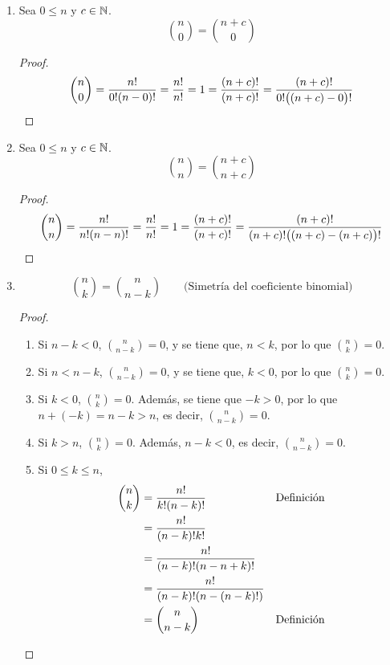 \begin{enumerate}[label=\alph*)]
  \item Sea $0\leq n$ y $c\in \mathbb{N}$. \[\binom{n}{0} = \binom{n+c}{0}\]
  \begin{proof}\leavevmode
    \[\binom{n}{0} = \frac{n!}{0!(n-0)!} = \frac{n!}{n!} = 1 = \frac{(n+c)!}{(n+c)!} = \frac{(n+c)!}{0!\big((n+c)-0\big)!} \qedhere\]
  \end{proof}
  
  \item Sea $0\leq n$ y $c\in \mathbb{N}$. \[\binom{n}{n} = \binom{n+c}{n+c}\]
  \begin{proof}\leavevmode
    \[\binom{n}{n} = \frac{n!}{n!(n-n)!} = \frac{n!}{n!} = 1 = \frac{(n+c)!}{(n+c)!} = \frac{(n+c)!}{(n+c)!\big((n+c)-(n+c)\big)!} \qedhere\]
  \end{proof}
  
  \item \[\binom{n}{k} = \binom{n}{n-k} \qquad \text{(Simetría del coeficiente binomial)}\]
  \begin{proof}\leavevmode
    \begin{enumerate}[label=\roman*)]
      \item Si $n-k<0$, $\binom{n}{n-k}=0$, y se tiene que, $n<k$, por lo que $\binom{n}{k}=0$.
      \item Si $n<n-k$, $\binom{n}{n-k}=0$, y se tiene que, $k<0$, por lo que $\binom{n}{k}=0$.
      \item Si $k<0$, $\binom{n}{k} = 0$. Además, se tiene que $-k>0$, por lo que $n+(-k)=n-k>n$, es decir, $\binom{n}{n-k} = 0$.
      \item Si $k>n$, $\binom{n}{k} = 0$. Además, $n-k<0$, es decir, $\binom{n}{n-k} = 0$.
      \item Si $0\leq k \leq n$,
      \begin{align*}
        \binom{n}{k} &= \frac{n!}{k!(n-k)!} && \text{Definición}\\
        &= \frac{n!}{(n-k)!k!}\\
        &= \frac{n!}{(n-k)!(n-n+k)!}\\
        &= \frac{n!}{(n-k)!(n-(n-k)!)}\\
        &= \binom{n}{n-k} && \text{Definición} \qedhere
      \end{align*}
    \end{enumerate}
  \end{proof}

  \clearpage\pagebreak
  

\end{enumerate}

